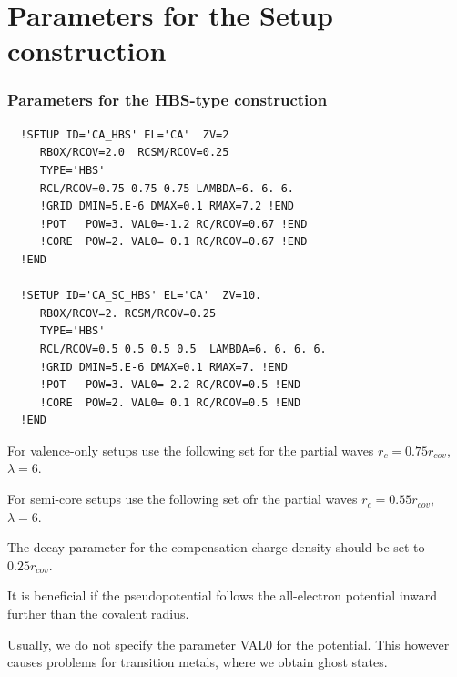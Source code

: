 \documentclass[11pt,a4paper]{report}
\begin{document}
\chapter{Parameters for the Setup construction}
\subsection{Parameters for the HBS-type construction}
\begin{verbatim}
  !SETUP ID='CA_HBS' EL='CA'  ZV=2   
     RBOX/RCOV=2.0  RCSM/RCOV=0.25     
     TYPE='HBS' 
     RCL/RCOV=0.75 0.75 0.75 LAMBDA=6. 6. 6. 
     !GRID DMIN=5.E-6 DMAX=0.1 RMAX=7.2 !END
     !POT   POW=3. VAL0=-1.2 RC/RCOV=0.67 !END
     !CORE  POW=2. VAL0= 0.1 RC/RCOV=0.67 !END
  !END

  !SETUP ID='CA_SC_HBS' EL='CA'  ZV=10.  
     RBOX/RCOV=2. RCSM/RCOV=0.25 
     TYPE='HBS'
     RCL/RCOV=0.5 0.5 0.5 0.5  LAMBDA=6. 6. 6. 6.
     !GRID DMIN=5.E-6 DMAX=0.1 RMAX=7. !END
     !POT   POW=3. VAL0=-2.2 RC/RCOV=0.5 !END
     !CORE  POW=2. VAL0= 0.1 RC/RCOV=0.5 !END
  !END
\end{verbatim}

For valence-only setups use the following set for the partial waves
$r_c=0.75 r_{cov}$, $\lambda=6$.

For semi-core setups use the following set ofr the partial waves
$r_c=0.55 r_{cov}$, $\lambda=6$.

The decay parameter for the compensation charge density should be set
to $0.25 r_{cov}$.

It is beneficial if the pseudopotential follows the all-electron
potential inward further than the covalent radius.

Usually, we do not specify the parameter VAL0 for the potential. This
however causes problems for transition metals, where we obtain ghost
states.


\printindex


\end{document}

